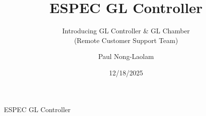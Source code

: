 \documentclass{beamer}
\title{ESPEC GL Controller}
\subtitle{Introducing GL Controller \& GL Chamber\\ (Remote Customer Support Team)}
\author{Paul Nong-Laolam}%
\institute[ESPEC NA, Inc.] %
{
  ESPEC North America, Inc. \\ 
  4141 Central Parkway \\
  Hudsonville, Michigan 49426 (USA) 
  }
\date{12/18/2025}
\begin{document}
\begin{frame}
  \titlepage
\end{frame}

\begin{frame}{ESPEC GL Controller}
  \tableofcontents
\end{frame}
%


%


\end{document}
